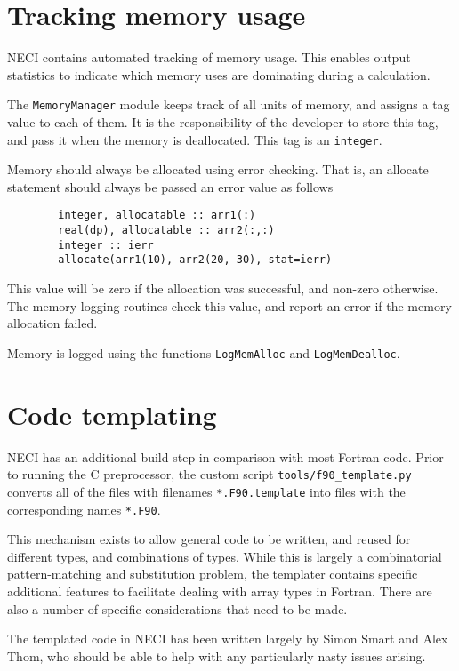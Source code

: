 \documentclass[a4paper,notitlepage]{scrreprt}
\let\code\lstinline
\begin{document}
\section{Tracking memory usage}
	NECI contains automated tracking of memory usage. This enables output
	statistics to indicate which memory uses are dominating during a
	calculation.

	The \code{MemoryManager} module keeps track of all units of memory, and
	assigns a tag value to each of them. It is the responsibility of the
	developer to store this tag, and pass it when the memory is deallocated.
	This tag is an \code{integer}.

	Memory should always be allocated using error checking. That is, an
	allocate statement should always be passed an error value as follows
	\begin{lstlisting}
		integer, allocatable :: arr1(:)
		real(dp), allocatable :: arr2(:,:)
		integer :: ierr
		allocate(arr1(10), arr2(20, 30), stat=ierr)
	\end{lstlisting}
	This value will be zero if the allocation was successful, and non-zero
	otherwise. The memory logging routines check this value, and report an
	error if the memory allocation failed.

	Memory is logged using the functions \code{LogMemAlloc} and
	\code{LogMemDealloc}.



\section{Code templating}
\label{sect:templating}
	NECI has an additional build step in comparison with most Fortran code.
	Prior to running the C preprocessor, the custom script
	\code{tools/f90_template.py} converts all of the files with filenames
	\code{*.F90.template} into files with the corresponding names
	\code{*.F90}.

	This mechanism exists to allow general code to be written, and reused for
	different types, and combinations of types. While this is largely a
	combinatorial pattern-matching and substitution problem, the templater
	contains specific additional features to facilitate dealing with array
	types in Fortran. There are also a number of specific considerations that
	need to be made.

	The templated code in NECI has been written largely by Simon Smart and Alex
	Thom, who should be able to help with any particularly nasty issues
	arising.
\end{document}
